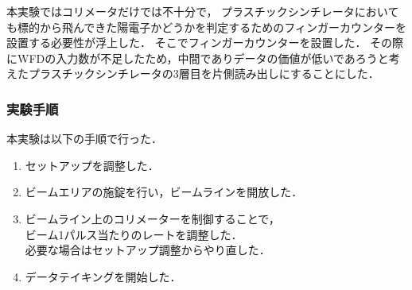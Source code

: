 本実験ではコリメータだけでは不十分で，
プラスチックシンチレータにおいても標的から飛んできた陽電子かどうかを判定するためのフィンガーカウンターを設置する必要性が浮上した．
そこでフィンガーカウンターを設置した．
その際にWFDの入力数が不足したため，中間でありデータの価値が低いであろうと考えたプラスチックシンチレータの3層目を片側読み出しにすることにした．

\subsubsection{実験手順}
本実験は以下の手順で行った．
\begin{enumerate}
  \item セットアップを調整した．
  \item ビームエリアの施錠を行い，ビームラインを開放した．%
  \item ビームライン上のコリメーターを制御することで， \\ビーム1パルス当たりのレートを調整した．
    \\必要な場合はセットアップ調整からやり直した．
  \item データテイキングを開始した．
\end{enumerate}
%
